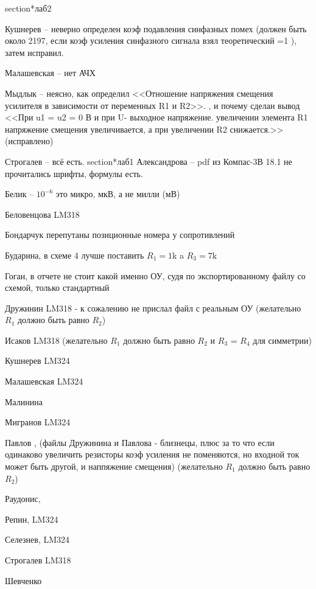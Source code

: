 \documentclass[a4paper,11pt]{article}
\begin{document}
\newpage
section*{лаб2}

Кушнерев -- неверно определен коэф подавления синфазных помех (должен быть около 2197, если коэф усиления синфазного сигнала взял теоретический =1 ), затем исправил.

Малашевская -- нет АЧХ

Мыдлык -- неясно, как определил <<Отношение напряжения смещения усилителя в зависимости от переменных R1 и R2>>.
, и почему сделан вывод 
<<При u1 = u2 = 0 В и при U- выходное напряжение. увеличении элемента R1 напряжение смещения увеличивается, а при увеличении R2 снижается.>>(исправлено)

Строгалев -- всё есть.
\newpage
section*{лаб1}
Александрова -- pdf из Компас-3В 18.1 не прочитались шрифты, формулы есть.

Белик        -- $10^{-6}$ это микро, мкВ, а не милли (мВ)

Беловенцова     LM318

Бондарчук  перепутаны позиционные номера у сопротивлений

Бударина, в схеме 4 лучше поставить $R_1=1$k a $R_3=7$k

Гоган, в отчете не стоит какой именно ОУ, судя по экспортированному файлу со схемой, только стандартный

Дружинин  LM318 - к сожалению не прислал файл с реальным ОУ (желательно $R_1$ должно быть равно $R_2$)

Исаков  LM318 (желательно $R_1$ должно быть равно $R_2$ и $R_3$ = $R_4$  для симметрии)

Кушнерев LM324

Малашевская LM324

Малинина

Мигранов LM324


Павлов , (файлы Дружинина и Павлова - близнецы, плюс за то что если одинаково увеличить резисторы коэф усиления не поменяются, но входной ток может быть другой, и наппяжение смещения)
(желательно $R_1$ должно быть равно $R_2$)

Раудонис, 

Репин, LM324

Селезнев, LM324

Строгалев LM318

Шевченко
\end{document}
